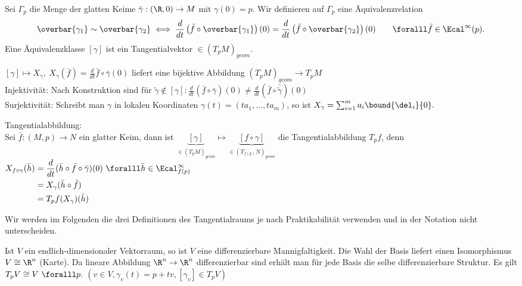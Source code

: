 \begin{defn}
	Sei $ \Gamma_p $ die Menge der glatten Keime $ \bar{\gamma}: (\R,0) \to M $ mit $\gamma(0) = p$. Wir definieren auf $\Gamma_p$ eine Äquivalenzrelation 
	\[ \overbar{\gamma_1} \sim \overbar{\gamma_2} \iff \frac{d}{d t}\left( \bar{f} \circ \overbar{\gamma_1} \right)(0) = \frac{d}{d t}\left( \bar{f} \circ \overbar{\gamma_2} \right)(0) \qquad \foralll \bar{f} \in \Ecal^\infty(p). \]
	Eine Äquivalenzklasse $[\gamma]$ ist ein Tangentialvektor $ \in (T_pM)_{geom} $.
\end{defn}

\begin{rem*}
	$ [\gamma] \mapsto X_\gamma,\ X_\gamma(\bar{f}) = \frac{d}{dt} \bar{f} \circ \bar{\gamma} (0) $ liefert eine bijektive Abbildung $ (T_pM)_{geom} \to T_pM $\\
	Injektivität: Nach Konstruktion sind für $ \tilde{\gamma} \notin [\gamma]: \frac{d}{dt}(\bar{f} \circ \bar{\gamma}) (0) \neq \frac{d}{dt}(\bar{f} \circ \bar{\tilde{\gamma}}) (0) $\\
	Surjektivität: Schreibt man $\gamma$ in lokalen Koordinaten $\gamma(t) = (ta_1,\dotsc,ta_m)$, so ist $X_\gamma = \sum_{i=1}^{m} a_i \bound{\del_i}{0}.$
\end{rem*}

\begin{rem*}
	Tangentialabbildung:\\
	Sei $ \bar{f} : (M,p) \to N $ ein glatter Keim, dann ist $ \underbrace{[\gamma]}_{\in (T_pM)_{geom}} \mapsto \underbrace{[f \circ \gamma]}_{\in (T_{f(p)} N)_{geom}} $ die Tangentialabbildung $T_pf$, denn $\begin{aligned}[t]
		 X_{f \circ \gamma}(\bar{h}) &= \frac{d}{d t} (\bar{h} \circ \bar{f} \circ \bar{\gamma}) (0)\\
		 &= X_\gamma (\bar{h}\circ\bar{f})\\
		 &= T_pf(X_\gamma)(\bar{h}) 
	\end{aligned} \ \foralll \bar{h} \in \Ecal^\infty_{f(p)} $
\end{rem*}

Wir werden im Folgenden die drei Definitionen des Tangentialraums je nach Praktikabilität verwenden und in der Notation nicht unterscheiden.

\begin{exmp*}
	Ist $V$ ein endlich-dimensionaler Vektorraum, so ist $V$ eine differenzierbare Mannigfaltigkeit. Die Wahl der Basis liefert einen Isomorphismus $ V \cong \R^n $ (Karte). Da lineare Abbildung $\R^n \to \R^n$ differenzierbar sind erhält man für jede Basis die selbe differenzierbare Struktur. Es gilt $ T_pV \cong V \ \foralll p. $ $ (v \in V, \gamma_v(t) = p + tv, [\gamma_v] \in T_pV) $
\end{exmp*}

